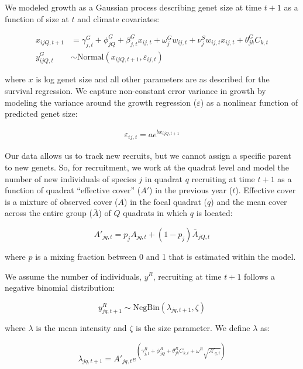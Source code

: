 \documentclass[12pt,]{article}
\begin{document}
We modeled growth as a Gaussian process describing genet size at time
$t+1$ as a function of size at $t$ and climate covariates:

\begin{align}
x_{ijQ,t+1} &= \gamma^{G}_{j,t} + \phi^{G}_{jQ} + \beta^{G}_{j,t}x_{ij,t} + \omega^{G}_{j}w_{ij,t} + \nu^{S}_{j}w_{ij,t}x_{ij,t} + \theta^{G}_{jk}C_{k,t} \\
y^{G}_{ijQ,t} &\sim \text{Normal}(x_{ijQ,t+1}, \varepsilon_{ij,t})
\end{align}

where $x$ is log genet size and all other parameters are as described
for the survival regression. We capture non-constant error variance in
growth by modeling the variance around the growth regression
($\varepsilon$) as a nonlinear function of predicted genet size:

\begin{align}
\varepsilon_{ij,t} = a e^{b x_{ijQ,t+1}}
\end{align}

Our data allows us to track new recruits, but we cannot assign a
specific parent to new genets. So, for recruitment, we work at the
quadrat level and model the number of new individuals of species $j$ in
quadrat $q$ recruiting at time $t+1$ as a function of quadrat
``effective cover'' ($A'$) in the previous year ($t$). Effective cover
is a mixture of observed cover ($A$) in the focal quadrat ($q$) and the
mean cover across the entire group ($\bar{A}$) of $Q$ quadrats in which
$q$ is located:

\begin{equation}
A'_{jq,t} = p_{j}A_{jq,t} + (1-p_{j})\bar{A}_{jQ,t}
\end{equation}

where $p$ is a mixing fraction between 0 and 1 that is estimated within
the model.

We assume the number of individuals, $y^{R}$, recruiting at time $t+1$
follows a negative binomial distribution:

\begin{equation}
y^{R}_{jq,t+1} \sim \text{NegBin}(\lambda_{jq,t+1},\zeta)
\end{equation}

where $\lambda$ is the mean intensity and $\zeta$ is the size parameter.
We define $\lambda$ as:

\begin{equation}
\lambda_{jq,t+1} = A'_{jq,t}e^{(\gamma^{R}_{j,t} + \phi^{R}_{jQ} + \theta^{R}_{jk}C_{k,t} + \omega^{R}\sqrt{A'_{q,t}})}
\end{equation}
\end{document}
